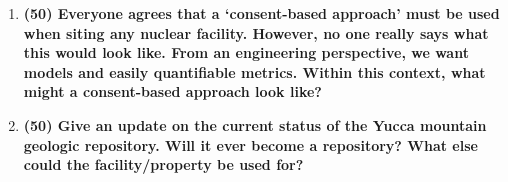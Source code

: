 \documentclass[11pt,a4paper]{article}
\begin{document}
\begin{enumerate}[leftmargin=*,topsep=0pt,font=\bfseries]
       
       
       
       
       
       
       
       
       
       
       
       
       \newpage 
   \item\textbf{(50) Everyone agrees that a `consent-based approach' must be used when siting any nuclear facility. However, no one really says what this would look like. From an engineering perspective, we want models and easily quantifiable metrics. Within this context, what might a consent-based approach look like?}
        \vspace{0.25in}\\
       
       
       
       
       
       
       
       
       
       
       
       
       
       
       
       \newpage 
   \item\textbf{(50) Give an update on the current status of the Yucca mountain geologic repository. Will it ever become a repository? What else could the facility/property be used for?}
        \vspace{0.25in}\\















\end{enumerate}

\newpage


\setlength{\bibhang}{0pt}

\end{document}
